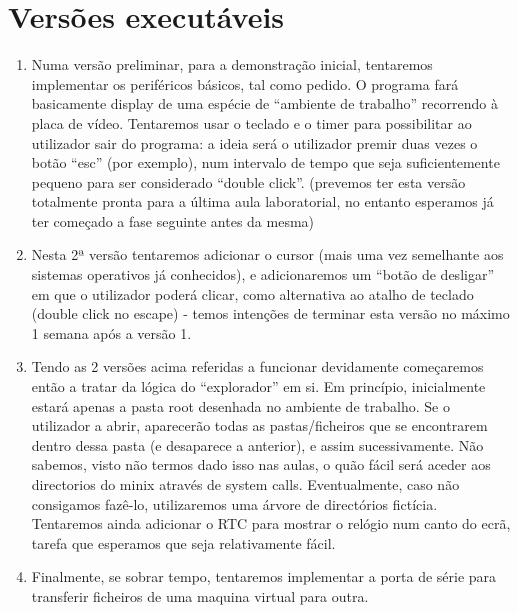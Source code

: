 \documentclass[a4paper]{article}
\begin{document}
\section{Versões executáveis}
 
 
 
\begin{enumerate}
	


\item Numa versão preliminar, para a demonstração inicial, tentaremos implementar os periféricos básicos, tal como pedido. O programa fará basicamente display de uma espécie de “ambiente de trabalho” recorrendo à placa de vídeo. Tentaremos usar o teclado e o timer para possibilitar ao utilizador sair do programa: a ideia será o utilizador premir duas vezes o botão “esc” (por exemplo), num intervalo de tempo que seja suficientemente pequeno para ser considerado “double click”. (prevemos ter esta versão totalmente pronta para a última aula laboratorial, no entanto esperamos já ter começado a fase seguinte antes da mesma)


\item Nesta 2ª versão tentaremos adicionar o cursor (mais uma vez semelhante aos sistemas operativos já conhecidos), e adicionaremos um “botão de desligar” em que o utilizador poderá clicar, como alternativa ao atalho de teclado (double click no escape) - temos intenções de terminar esta versão no máximo 1 semana após a versão 1.


\item Tendo as 2 versões acima referidas a funcionar devidamente começaremos então a tratar da lógica do “explorador” em si. Em princípio, inicialmente estará apenas a pasta root desenhada no ambiente de trabalho. Se o utilizador a abrir, aparecerão todas as pastas/ficheiros que se encontrarem dentro dessa pasta (e desaparece a anterior), e assim sucessivamente. Não sabemos, visto não termos dado isso nas aulas, o quão fácil será aceder aos directorios do minix através de system calls. Eventualmente, caso não consigamos fazê-lo, utilizaremos uma árvore de directórios fictícia. Tentaremos ainda adicionar o RTC para mostrar o relógio num canto do ecrã, tarefa que esperamos que seja relativamente fácil. 


\item Finalmente, se sobrar tempo, tentaremos implementar a porta de série para transferir ficheiros de uma maquina virtual para outra. 

\end{enumerate} 
	
\end{document}
